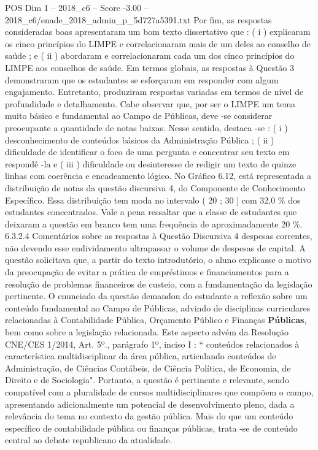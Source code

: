 \begin{textsample}{POS Dim 1 – 2018\_c6 – Score -3.00 – 2018\_c6/enade\_2018\_admin\_p\_5d727a5391.txt}
Por fim, as respostas consideradas boas apresentaram um bom texto dissertativo que : ( i ) explicaram os cinco princípios do LIMPE e correlacionaram mais de um deles ao conselho de saúde ; e ( ii ) abordaram e correlacionaram cada um dos cinco princípios do LIMPE aos conselhos de saúde.
Em termos globais, as respostas à Questão 3 demonstraram que os estudantes se esforçaram em responder com algum engajamento.
Entretanto, produziram respostas variadas em termos de nível de profundidade e detalhamento.
Cabe observar que, por ser o LIMPE um tema muito básico e fundamental ao Campo de Públicas, deve -se considerar preocupante a quantidade de notas baixas.
Nesse sentido, destaca -se : ( i ) desconhecimento de conteúdos básicos da Administração Pública ; ( ii ) dificuldade de identificar o foco de uma pergunta e concentrar seu texto em respondê -la e ( iii ) dificuldade ou desinteresse de redigir um texto de quinze linhas com coerência e encadeamento lógico.
No Gráfico 6.12, está representada a distribuição de notas da questão discursiva 4, do Componente de Conhecimento Específico.
Essa distribuição tem moda no intervalo ( 20 ; 30 ] com 32,0 \% dos estudantes concentrados.
Vale a pena ressaltar que a classe de estudantes que deixaram a questão em branco tem uma frequência de aproximadamente 20 \%. 6.3.2.4 Comentários sobre as respostas à Questão Discursiva 4 despesas correntes, não devendo esse endividamento ultrapassar o volume de despesas de capital.
A questão solicitava que, a partir do texto introdutório, o aluno explicasse o motivo da preocupação de evitar a prática de empréstimos e financiamentos para a resolução de problemas financeiros de custeio, com a fundamentação da legislação pertinente.
O enunciado da questão demandou do estudante a reflexão sobre um conteúdo fundamental ao Campo de Públicas, advindo de disciplinas curriculares relacionadas à Contabilidade Pública, Orçamento Público e Finanças \textbf{Públicas}, bem como sobre a legislação relacionada.
Este aspecto advém da Resolução CNE/CES 1/2014, Art. 5º., parágrafo 1º, inciso I : “ conteúdos relacionados à característica multidisciplinar da área pública, articulando conteúdos de Administração, de Ciências Contábeis, de Ciência Política, de Economia, de Direito e de Sociologia".
Portanto, a questão é pertinente e relevante, sendo compatível com a pluralidade de cursos multidisciplinares que compõem o campo, apresentando adicionalmente um potencial de desenvolvimento pleno, dada a relevância do tema no contexto da gestão pública.
Mais do que um conteúdo específico de contabilidade pública ou finanças públicas, trata -se de conteúdo central ao debate republicano da atualidade.

\end{textsample}
